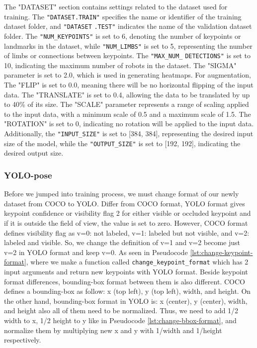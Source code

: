The "DATASET" section contains settings related to the dataset used for training.
The \verb|"DATASET.TRAIN"| specifies the name or identifier of the training dataset folder, and \verb|"DATASET| \verb|.TEST"| indicates the name of the validation dataset folder. The \verb|"NUM_KEYPOINTS"| is set to 6, denoting the number of keypoints or landmarks in the dataset, while \verb|"NUM_LIMBS"| is set to 5, representing the number of limbs or connections between keypoints.
The \verb|"MAX_NUM_| \verb|DETECTIONS"| is set to 10, indicating the maximum number of robots in the dataset. The "SIGMA" parameter is set to 2.0, which is used in generating heatmaps. For augmentation, The "FLIP" is set to 0.0, meaning there will be no horizontal flipping of the input data. The "TRANSLATE" is set to 0.4, allowing the data to be translated by up to 40\% of its size.
The "SCALE" parameter represents a range of scaling applied to the input data, with a minimum scale of 0.5 and a maximum scale of 1.5. The "ROTATION" is set to 0, indicating no rotation will be applied to the input data. Additionally, the \verb|"INPUT_SIZE"| is set to [384, 384], representing the desired input size of the model, while the \verb|"OUTPUT_SIZE"| is set to [192, 192], indicating the desired output size.

\subsubsection{YOLO-pose}
\label{subsubsec:training-yolo-pose}

Before we jumped into training process, we must change format of our newly dataset from COCO to YOLO. Differ from COCO format, YOLO format gives keypoint confidence or visibility flag 2 for either visible or occluded keypoint
and if it is outside the field of view, the value is set to zero. However, COCO format defines visibility flag as v=0: not labeled, v=1: labeled but not visible, and v=2: labeled and visible. So, we change the definition of
v=1 and v=2 become just v=2 in YOLO format and keep v=0. As seen in Pseudocode \ref{lst:change-keypoint-format}, where we make a function called \verb|change_keypoint_format| which has 2 input arguments and return new keypoints with YOLO format. 
Beside keypoint format differences, bounding-box format between them is also different. COCO defines a bounding-box as follow: x (top left), y (top left), width, and height. On the other hand,
bounding-box format in YOLO is: x (center), y (center), width, and height also all of them need to be normalized. Thus, we need to add 1/2 width to x, 1/2 height to y like in Pseudocode \ref{lst:change-bbox-format}, and normalize them by multiplying new x and y with 1/width and 1/height respectively. 

